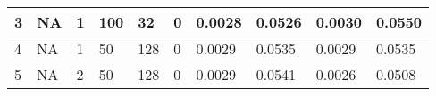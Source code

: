 \begin{table}
{\begin{tabular}{|llllllllll|}
3             & NA                                                              & 1                                                               & 100            & 32                                                             & 0                & 0.0028                                                                    & 0.0526                                                                   & 0.0030                                                               & 0.0550                                                              \\ \hline
4             & NA                                                              & 1                                                               & 50             & 128                                                            & 0                & 0.0029                                                                    & 0.0535                                                                   & 0.0029                                                               & 0.0535                                                              \\ \hline
5             & NA                                                              & 2                                                               & 50             & 128                                                            & 0                & 0.0029                                                                    & 0.0541                                                                   & 0.0026                                                               & 0.0508                                                              \\ \hline
\end{tabular}}
\end{table}

